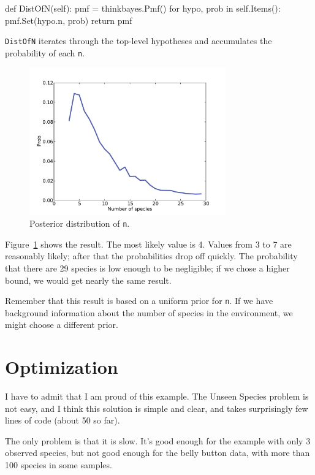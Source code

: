 \documentclass[12pt]{book}
\theoremstyle{exercise}
\begin{document}
\begin{code}
    def DistOfN(self):
        pmf = thinkbayes.Pmf()
        for hypo, prob in self.Items():
            pmf.Set(hypo.n, prob)
        return pmf
\end{code}

{\tt DistOfN} iterates
through the top-level hypotheses and accumulates the probability
of each {\tt n}.

\begin{figure}
\centerline{\includegraphics[height=2.5in]{figs/species2.pdf}}
\caption{Posterior distribution of {\tt n}.}
\label{fig.species2}
\end{figure}

Figure~\ref{fig.species2} shows the result.  The most likely value is 4.
Values from 3 to 7 are reasonably likely; after that the probabilities
drop off quickly.  The probability that there are 29 species is
low enough to be negligible; if we chose a higher bound, 
we would get nearly the same result.

Remember that this result is based on a uniform prior for {\tt n}.  If
we have background information about the number of species in the
environment, we might choose a different prior.  


\section{Optimization}

I have to admit that I am proud of this example.  The Unseen Species
problem is not easy, and I think this solution is simple and clear,
and takes surprisingly few lines of code (about 50 so far).

The only problem is that it is slow.  It's good enough for the example
with only 3 observed species, but not good enough for the belly button
data, with more than 100 species in some samples.
\end{document}
